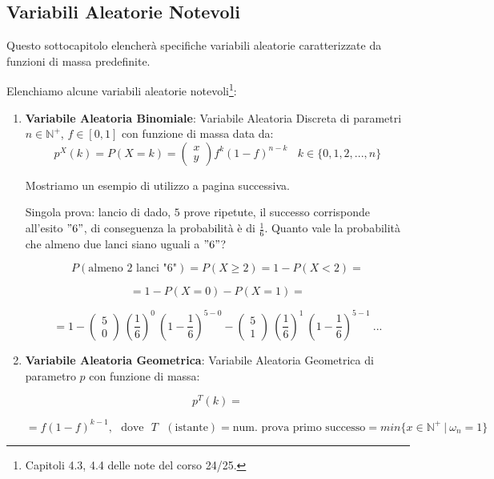 \documentclass{article}
\begin{document}
\subsection{Variabili Aleatorie Notevoli}

Questo sottocapitolo elencherà specifiche variabili aleatorie caratterizzate da funzioni di massa predefinite.

Elenchiamo alcune variabili aleatorie notevoli\footnote{Capitoli 4.3, 4.4 delle note del corso 24/25.}:

\begin{enumerate}
    \item \textbf{Variabile Aleatoria Binomiale}: Variabile Aleatoria Discreta di parametri $n \in \mathbb{N^{+}}$, $f \in [0,1]$ con funzione di massa data da:
    \[ p^{X}(k) = P(X=k) = \left (\begin{array}{c} x \\ y \end{array} \right ) f^{k}(1-f)^{n-k} \:\:\:\: k \in \{ 0,1,2, ...,n \} \]


Mostriamo un esempio di utilizzo a pagina successiva.

\newpage

Singola prova: lancio di dado, $5$ prove ripetute, il successo corrisponde all'esito $"6"$, di conseguenza la probabilità è di $\frac{1}{6}$. Quanto vale
la probabilità che almeno due lanci siano uguali a $"6"$?

\[ P(\text{almeno 2 lanci "6"}) = P(X \geq 2 ) = 1 - P(X < 2) = \]

\[ =  1 - P(X=0) - P(X=1) = \]

\[ = 1 - \left (\begin{array}{c} 5 \\ 0 \end{array} \right ) \: \left (\frac{1}{6} \right )^{0} \: \left (1 - \frac{1}{6} \right )^{5-0} - \left (\begin{array}{c} 5 \\ 1 \end{array} \right ) \: \left (\frac{1}{6} \right )^{1} \: \left (1 - \frac{1}{6} \right )^{5-1} \: ... \]

\item \textbf{Variabile Aleatoria Geometrica}: Variabile Aleatoria Geometrica di parametro $p$ con funzione di massa:

\[ p^{T}(k) = \]

\vspace*{-20px}

\[ = f(1-f)^{k-1}, \:\:\: \text{dove} \:\:\: T \:\:\: (\text{istante}) = \text{num. prova primo successo} = min\{ x \in \mathbb{N}^{+} \: | \: \omega_{n} = 1 \} \]


\end{enumerate}
\end{document}
